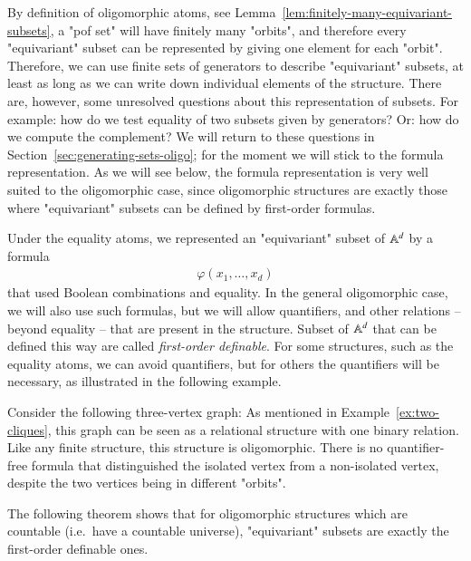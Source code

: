 By definition of oligomorphic atoms, see  Lemma~\ref{lem:finitely-many-equivariant-subsets}, a "pof set" will have finitely many "orbits", and therefore every "equivariant" subset can be represented by giving one element for each "orbit". Therefore, we can use finite sets of generators to describe "equivariant" subsets, at least as long as we can write down individual elements of the structure.  There are, however, some unresolved questions about this representation of subsets. For example: how do we test equality of two subsets given by generators? Or: how do we compute the complement? We will return to these questions in Section~\ref{sec:generating-sets-oligo}; for the moment we will stick to the formula representation.  As we will see below, the formula representation is very well suited to the oligomorphic case, since oligomorphic structures are exactly those where "equivariant" subsets can be defined by first-order formulas.

Under the equality atoms, we represented an "equivariant" subset of $\mathbb A^d$ by a formula 
\begin{align*}
\varphi(x_1,\ldots,x_d)
\end{align*}
that used  Boolean combinations and equality. In the general oligomorphic case, we will also use such formulas, but we will allow 
quantifiers, and other relations -- beyond equality -- that are present in  the structure. Subset of $\mathbb A^d$ that can be defined this way are called \emph{first-order definable}.
For some structures, such as the equality atoms, we can avoid quantifiers, but for others the quantifiers will be necessary, as illustrated in the following example.

\begin{myexample}\label{ex:oligo-squares}
	Consider  the following three-vertex graph: 
	As mentioned in Example~\ref{ex:two-cliques}, this graph can be seen as a relational structure with one binary relation. 
	Like any finite structure, this structure is oligomorphic. There is no quantifier-free formula that distinguished the isolated vertex from a non-isolated vertex, despite the two vertices being in different "orbits". 
\end{myexample}


The following theorem shows that  for oligomorphic structures which are countable (i.e.~have a countable universe), "equivariant" subsets are exactly the first-order definable ones.


